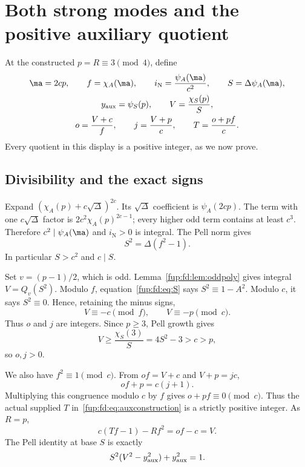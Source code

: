 \documentclass[11pt,letterpaper]{article}
\theoremstyle{definition}\newtheorem{definition}[theorem]{Definition}
\theoremstyle{remark}\newtheorem{remark}[theorem]{Remark}
\begin{document}
\section{Both strong modes and the positive auxiliary quotient}\label{fup:fd:sec:aux}
At the constructed $p=R\equiv3\pmod4$, define
\begin{equation}\label{fup:fd:eq:auxconstruction}
 \begin{gathered}
 \ma=2cp,\qquad f=\chi_A(\ma),\qquad
 i_{\mathrm N}=\frac{\psi_A(\ma)}{c^2},\qquad
 S=\Delta\psi_A(\ma),\\
 \yaux=\psi_S(p),\qquad V=\frac{\chi_S(p)}S,\\
 o=\frac{V+c}{f},\qquad j=\frac{V+p}{c},\qquad
 T=\frac{o+pf}{c}.
 \end{gathered}
\end{equation}
Every quotient in this display is a positive integer, as we now prove.

\subsection{Divisibility and the exact signs}
Expand $(\chi_A(p)+c\sqrt\Delta)^{2c}$. Its $\sqrt\Delta$ coefficient is $\psi_A(2cp)$. The term with one $c\sqrt\Delta$ factor is $2c^2\chi_A(p)^{2c-1}$; every higher odd term contains at least $c^3$. Therefore $c^2\mid\psi_A(\ma)$ and $i_{\mathrm N}>0$ is integral. The Pell norm gives
\begin{equation}\label{fup:fd:eq:S}
 S^2=\Delta(f^2-1).
\end{equation}
In particular $S>c^2$ and $c\mid S$.

Set $v=(p-1)/2$, which is odd. Lemma~\ref{fup:fd:lem:oddpoly} gives integral $V=Q_v(S^2)$. Modulo $f$, equation~\eqref{fup:fd:eq:S} says $S^2\equiv1-A^2$. Modulo $c$, it says $S^2\equiv0$. Hence, retaining the minus signs,
\begin{equation}\label{fup:fd:eq:Vcongruences}
 V\equiv-c\pmod f,\qquad V\equiv-p\pmod c.
\end{equation}
Thus $o$ and $j$ are integers. Since $p\ge3$, Pell growth gives
\[
 V\ge\frac{\chi_S(3)}S=4S^2-3>c>p,
\]
so $o,j>0$.

We also have $f^2\equiv1\pmod c$. From $of=V+c$ and $V+p=jc$,
\[
 of+p=c(j+1).
\]
Multiplying this congruence modulo $c$ by $f$ gives $o+pf\equiv0\pmod c$. Thus the actual supplied $T$ in~\eqref{fup:fd:eq:auxconstruction} is a strictly positive integer. As $R=p$,
\begin{equation}\label{fup:fd:eq:Vliteral}
 c(Tf-1)-Rf^2=of-c=V.
\end{equation}
The Pell identity at base $S$ is exactly
\begin{equation}\label{fup:fd:eq:auxnorm}
 S^2(V^2-y_{\mathrm{aux}}^2)+y_{\mathrm{aux}}^2=1.
\end{equation}
\end{document}
